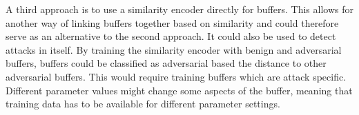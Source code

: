 A third approach is to use a similarity encoder directly for buffers. This allows for another way of linking buffers together based on similarity and could therefore serve as an alternative to the second approach. It could also be used to detect attacks in itself. By training the similarity encoder with benign and adversarial buffers, buffers could be classified as adversarial based the distance to other adversarial buffers. This would require training buffers which are attack specific. Different parameter values might change some aspects of the buffer, meaning that training data has to be available for different parameter settings.\\%